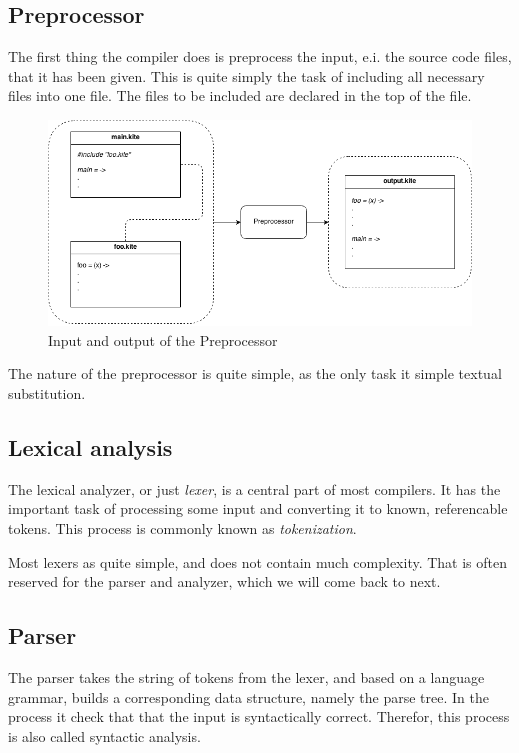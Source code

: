 \subsection{Preprocessor}
The first thing the compiler does is preprocess the input, e.i. the
source code files, that it has been given. This is quite simply the
task of including all necessary files into one file. The files to be
included are declared in the top of the file.

\begin{figure}[H]
  \label{fig:preprocessor}
  \center
  \includegraphics[scale=0.45]{images/preprocessor.png}
  \caption{Input and output of the Preprocessor}
\end{figure}

The nature of the preprocessor is quite simple, as the only task it
simple textual substitution.

\subsection{Lexical analysis}
The lexical analyzer, or just \emph{lexer}, is a central part of most
compilers. It has the important task of processing some input and
converting it to known, referencable tokens. This process is commonly
known as \emph{tokenization}.

Most lexers as quite simple, and does not contain much
complexity. That is often reserved for the parser and analyzer, which
we will come back to next.

\subsection{Parser}
The parser takes the string of tokens from the lexer, and based on a
language grammar, builds a corresponding data structure, namely the
parse tree. In the process it check that that the input is
syntactically correct. Therefor, this process is also called syntactic
analysis.

